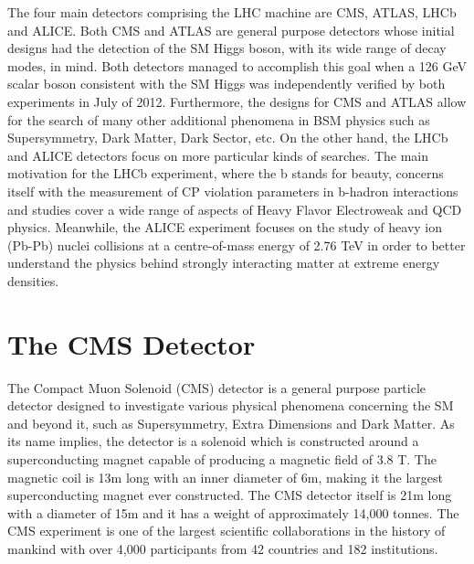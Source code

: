 The four main detectors comprising the LHC machine are CMS, ATLAS\cite{ATLAS}, LHCb\cite{LHCb} and ALICE\cite{ALICE}. Both CMS and ATLAS are general purpose detectors whose initial designs had the detection of the SM Higgs boson, with its wide range of decay modes, in mind. Both detectors managed to accomplish this goal when a 126 GeV scalar boson consistent with the SM Higgs was independently verified by both experiments in July of 2012. Furthermore, the designs for CMS and ATLAS allow for the search of many other additional phenomena in BSM physics such as Supersymmetry, Dark Matter\cite{DM}, Dark Sector\cite{DS}, etc. On the other hand, the LHCb and ALICE detectors focus on more particular kinds of searches. The main motivation for the LHCb experiment, where the b stands for beauty, concerns itself with the measurement of CP violation parameters in b-hadron interactions and studies cover a wide range of aspects of Heavy Flavor Electroweak and QCD physics. Meanwhile, the ALICE experiment focuses on the study of heavy ion (Pb-Pb) nuclei collisions at a centre-of-mass energy of 2.76 TeV in order to better understand the physics behind strongly interacting matter at extreme energy densities.

\section{The CMS Detector}
The Compact Muon Solenoid (CMS) detector is a general purpose particle detector designed to investigate various physical phenomena concerning the SM and beyond it, such as Supersymmetry, Extra Dimensions and Dark Matter. As its name implies, the detector is a solenoid which is constructed around a superconducting magnet capable of producing a magnetic field of 3.8 T. The magnetic coil is 13m long with an inner diameter of 6m, making it the largest superconducting magnet ever constructed. The CMS detector itself is 21m long with a diameter of 15m and it has a weight of approximately 14,000 tonnes. The CMS experiment is one of the largest scientific collaborations in the history of mankind with over 4,000 participants from 42 countries and 182 institutions.\\

